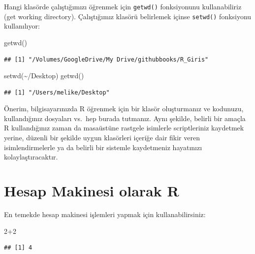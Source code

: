 \documentclass[
]{book}
\newenvironment{Shaded}{\begin{snugshade}}{\end{snugshade}}
\newcommand{\DecValTok}[1]{\textcolor[rgb]{0.00,0.00,0.81}{#1}}
\newcommand{\FunctionTok}[1]{\textcolor[rgb]{0.00,0.00,0.00}{#1}}
\newcommand{\NormalTok}[1]{#1}
\newcommand{\SpecialCharTok}[1]{\textcolor[rgb]{0.00,0.00,0.00}{#1}}
\newcommand{\StringTok}[1]{\textcolor[rgb]{0.31,0.60,0.02}{#1}}
\begin{document}
Hangi klasörde çalıştığımızı öğrenmek için \texttt{getwd()} fonksiyonunu kullanabiliriz (get working directory). Çalıştığımız klasörü belirlemek içinse \texttt{setwd()} fonksiyonu kullanılıyor:

\begin{Shaded}
\begin{Highlighting}[]
\FunctionTok{getwd}\NormalTok{()}
\end{Highlighting}
\end{Shaded}

\begin{verbatim}
## [1] "/Volumes/GoogleDrive/My Drive/githubbooks/R_Giris"
\end{verbatim}

\begin{Shaded}
\begin{Highlighting}[]
\FunctionTok{setwd}\NormalTok{(}\StringTok{\textquotesingle{}\textasciitilde{}/Desktop\textquotesingle{}}\NormalTok{)}
\FunctionTok{getwd}\NormalTok{()}
\end{Highlighting}
\end{Shaded}

\begin{verbatim}
## [1] "/Users/melike/Desktop"
\end{verbatim}

Önerim, bilgisayarınızda R öğrenmek için bir klasör oluşturmanız ve kodunuzu, kullandığınız dosyaları vs.~hep burada tutmanız. Aynı şekilde, belirli bir amaçla R kullandığınız zaman da masaüstüne rastgele isimlerle scriptleriniz kaydetmek yerine, düzenli bir şekilde uygun klasörleri içeriğe dair fikir veren isimlendirmelerle ya da belirli bir sistemle kaydetmeniz hayatınızı kolaylaştıracaktır.

\hypertarget{hesap-makinesi-olarak-r}{%
\section{Hesap Makinesi olarak R}\label{hesap-makinesi-olarak-r}}

En temekde hesap makinesi işlemleri yapmak için kullanabilirsiniz:

\begin{Shaded}
\begin{Highlighting}[]
\DecValTok{2}\SpecialCharTok{+}\DecValTok{2}
\end{Highlighting}
\end{Shaded}

\begin{verbatim}
## [1] 4
\end{verbatim}
\end{document}
